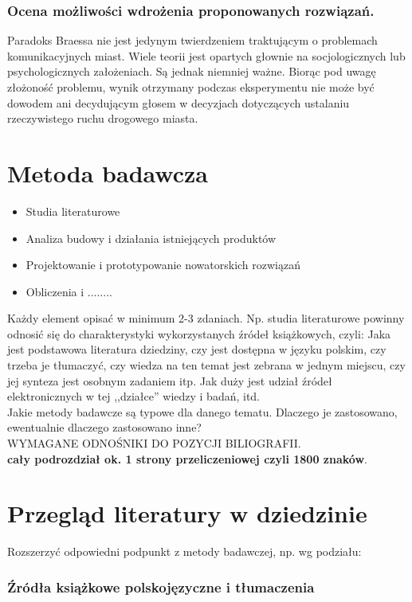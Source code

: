 \documentclass[twoside,12pt]{report}
\begin{document}
\subsubsection{Ocena możliwości wdrożenia proponowanych rozwiązań.}
Paradoks Braessa nie jest jedynym twierdzeniem traktującym o problemach komunikacyjnych miast. Wiele teorii jest opartych głownie na socjologicznych lub psychologicznych założeniach. Są jednak niemniej ważne.
Biorąc pod uwagę złożoność problemu, wynik otrzymany podczas eksperymentu nie może być dowodem ani decydującym głosem w decyzjach dotyczących ustalaniu rzeczywistego ruchu drogowego miasta. 


\section{Metoda badawcza}
\begin{itemize}
\item Studia literaturowe
\item Analiza budowy i działania istniejących produktów
\item Projektowanie i prototypowanie nowatorskich rozwiązań 
\item Obliczenia i ........
\end{itemize}

Każdy element opisać w minimum 2-3 zdaniach. Np. studia literaturowe powinny
odnosić się do charakterystyki wykorzystanych źródeł książkowych, czyli: Jaka
jest podstawowa literatura dziedziny, czy jest dostępna w języku polskim, czy trzeba je tłumaczyć, czy wiedza na ten
temat jest zebrana w jednym miejscu, czy jej synteza jest osobnym zadaniem itp. 
Jak duży jest udział źródeł elektronicznych w tej ,,działce'' wiedzy i badań,
itd. \\
\indent Jakie metody badawcze są typowe dla danego tematu. Dlaczego je
zastosowano, ewentualnie dlaczego zastosowano inne? \\
WYMAGANE ODNOŚNIKI DO POZYCJI BILIOGRAFII.\\
{\bf cały podrozdział ok. 1 strony przeliczeniowej czyli 1800 znaków}.

\section{Przegląd literatury w dziedzinie}
Rozszerzyć odpowiedni podpunkt z metody badawczej, np. wg podziału:
\subsubsection{Źródła książkowe polskojęzyczne i tłumaczenia}
\end{document}
